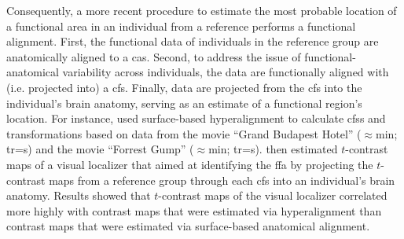 Consequently, a more recent procedure \citep[e.g.,][]{jiahui2020predicting,
guntupalli2016model, haxby2011common} to estimate the most probable location of
a functional area in an individual from a reference performs a functional
alignment.
First, the functional data of individuals in the reference group are
anatomically aligned to a \ac{cas}.
%
Second, to address the issue of functional-anatomical variability across
individuals, the data are functionally aligned with (i.e. projected into) a
\ac{cfs}.
%
Finally, data are projected from the \ac{cfs} into the individual's
brain anatomy, serving as an estimate of a functional region's location.
For instance, \citet{jiahui2020predicting} used surface-based hyperalignment to
calculate \acp{cfs} and transformations based on data from
%
the movie ``Grand Budapest Hotel'' ($\approx$\unit[50]{min};
\ac{tr}=\unit[1]{s}) and
%
the movie ``Forrest Gump'' ($\approx$\unit[120]{min}; \ac{tr}=\unit[2]{s}).
%
\citet{jiahui2020predicting} then estimated $t$-contrast maps of a visual
localizer that aimed at identifying the \ac{ffa} by projecting the $t$-contrast
maps from a reference group through each \ac{cfs} into an individual's brain
anatomy.
%
Results showed that $t$-contrast maps of the visual localizer correlated more
highly with contrast maps that were estimated via hyperalignment than contrast
maps that were estimated via surface-based anatomical alignment.





